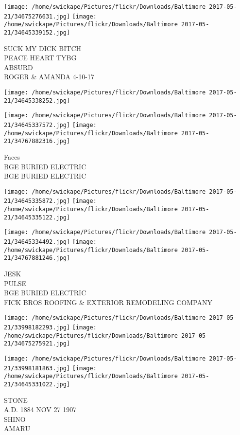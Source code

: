 \documentclass[10pt,letterpaper]{article}
\begin{document}
\texttt{[image: /home/swickape/Pictures/flickr/Downloads/Baltimore 2017-05-21/34675276631.jpg]}
\texttt{[image: /home/swickape/Pictures/flickr/Downloads/Baltimore 2017-05-21/34645339152.jpg]}

SUCK MY DICK BITCH\\
PEACE HEART TYBG\\
ABSURD\\
ROGER \& AMANDA 4{-}10{-}17
\pagebreak

\texttt{[image: /home/swickape/Pictures/flickr/Downloads/Baltimore 2017-05-21/34645338252.jpg]}

\vspace{0.25in}
\texttt{[image: /home/swickape/Pictures/flickr/Downloads/Baltimore 2017-05-21/34645337572.jpg]}
\texttt{[image: /home/swickape/Pictures/flickr/Downloads/Baltimore 2017-05-21/34767882316.jpg]}

Faces\\
BGE BURIED ELECTRIC\\
BGE BURIED ELECTRIC
\pagebreak

\texttt{[image: /home/swickape/Pictures/flickr/Downloads/Baltimore 2017-05-21/34645335872.jpg]}
\texttt{[image: /home/swickape/Pictures/flickr/Downloads/Baltimore 2017-05-21/34645335122.jpg]}

\texttt{[image: /home/swickape/Pictures/flickr/Downloads/Baltimore 2017-05-21/34645334492.jpg]}
\texttt{[image: /home/swickape/Pictures/flickr/Downloads/Baltimore 2017-05-21/34767881246.jpg]}

JESK\\
PULSE\\
BGE BURIED ELECTRIC\\
FICK BROS ROOFING \& EXTERIOR REMODELING COMPANY
\pagebreak

\texttt{[image: /home/swickape/Pictures/flickr/Downloads/Baltimore 2017-05-21/33998182293.jpg]}
\texttt{[image: /home/swickape/Pictures/flickr/Downloads/Baltimore 2017-05-21/34675275921.jpg]}

\texttt{[image: /home/swickape/Pictures/flickr/Downloads/Baltimore 2017-05-21/33998181863.jpg]}
\texttt{[image: /home/swickape/Pictures/flickr/Downloads/Baltimore 2017-05-21/34645331022.jpg]}

STONE\\
A.D. 1884 NOV 27 1907\\
SHINO\\
AMARU
\pagebreak
\end{document}
